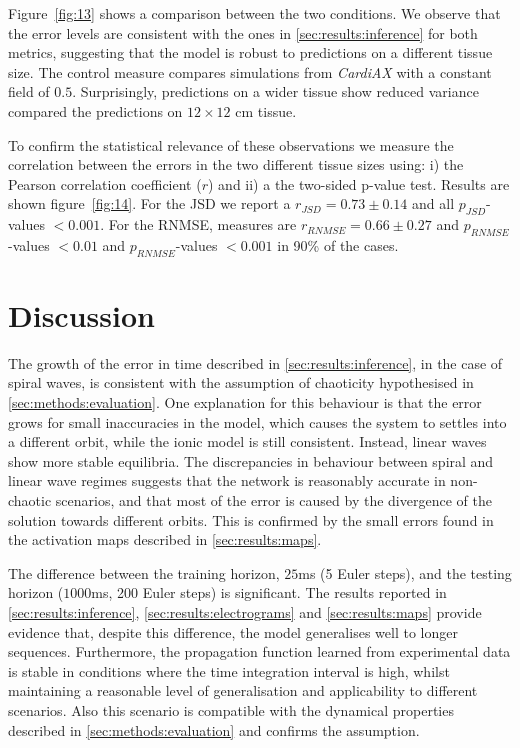 \documentclass[utf8]{frontiersSCNS} %
\begin{document}
Figure~\ref{fig:13} shows a comparison between the two conditions.
We observe that the error levels are consistent with the ones in \ref{sec:results:inference} for both metrics, suggesting that the model is robust to predictions on a different tissue size.
The control measure compares simulations from \textit{CardiAX} with a constant field of $0.5$.
Surprisingly, predictions on a wider tissue show reduced variance compared the predictions on $12 \times  12$ cm tissue.

To confirm the statistical relevance of these observations we measure the correlation between the errors in the two different tissue sizes using: i) the Pearson correlation coefficient ($r$) and ii) a the two-sided p-value test. 
Results are shown figure~\ref{fig:14}.
For the JSD we report a $r_{JSD} = 0.73 \pm 0.14 $ and all $p_{JSD}$-values $< 0.001$.
For the RNMSE, measures are $r_{RNMSE} = 0.66 \pm 0.27 $ and $p_{RNMSE}$-values $< 0.01$  and $p_{RNMSE}$-values $< 0.001$ in 90\% of the cases.



\section{Discussion}
\label{sec:discussion}
The growth of the error in time described in \ref{sec:results:inference}, in the case of spiral waves, is consistent with the assumption of chaoticity hypothesised in \ref{sec:methods:evaluation}.
One explanation for this behaviour is that the error grows for small inaccuracies in the model, which causes the system to settles into a different orbit, while the ionic model is still consistent. 
Instead, linear waves show more stable equilibria.
The discrepancies in behaviour between spiral and linear wave regimes suggests that the network is reasonably accurate in non-chaotic scenarios, and that most of the error is caused by the divergence of the solution towards different orbits.
This is confirmed by the small errors found in the activation maps described in \ref{sec:results:maps}.

The difference between the training horizon, $25$ms (5 Euler steps), and the testing horizon ($1000$ms, 200 Euler steps) is significant. The results reported in \ref{sec:results:inference}, \ref{sec:results:electrograms} and \ref{sec:results:maps} provide evidence that, despite this difference, the model generalises well to longer sequences. Furthermore, the propagation function learned from experimental data is stable in conditions where the time integration interval is high, whilst maintaining a reasonable level of generalisation and applicability to different scenarios.
Also this scenario is compatible with the dynamical properties described in \ref{sec:methods:evaluation} and confirms the assumption.
\end{document}
